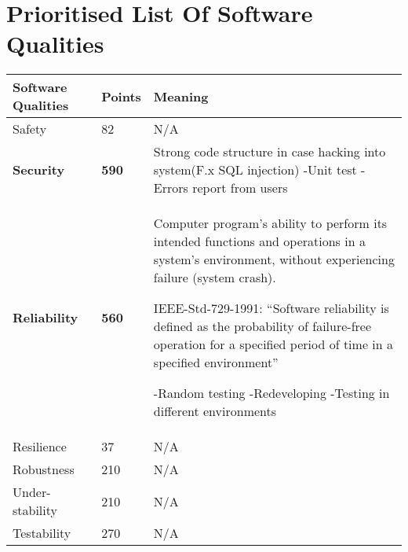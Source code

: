\renewcommand{\headrulewidth}{0.1pt}
\renewcommand{\footrulewidth}{0.1pt}

\section*{Prioritised List Of Software Qualities}

\begin{center}
	\def\arraystretch{1.5}%
	\begin{tabular}{| p{4cm} | p{4cm} | p{6cm} |}
	
 		\hline
			Software Qualities & Points & Meaning \\ \hline
   			Safety & 82 & N\slash A \\ \hline
			
			\textbf{Security} & \textbf{590} & Strong code structure in case hacking into system(F.x SQL injection)
			-Unit test
			-Errors report from users \\ \hline
			
			\textbf{Reliability} & \textbf{560} & Computer program’s ability  to perform its intended functions and operations in a system's environment, without experiencing failure (system crash).

			IEEE-Std-729-1991: “Software reliability is defined as the probability of failure-free operation for a specified period of time in a specified environment” 

			-Random testing
			-Redeveloping
			-Testing in different environments \\ \hline
			
			Resilience & 37 & N\slash A \\ \hline
			
			Robustness & 210 & N\slash A \\ \hline
			
			Under-stability & 210 & N\slash A \\ \hline
			
			Testability & 270 & N\slash A \\ \hline
			

\end{tabular}
\end{center}
